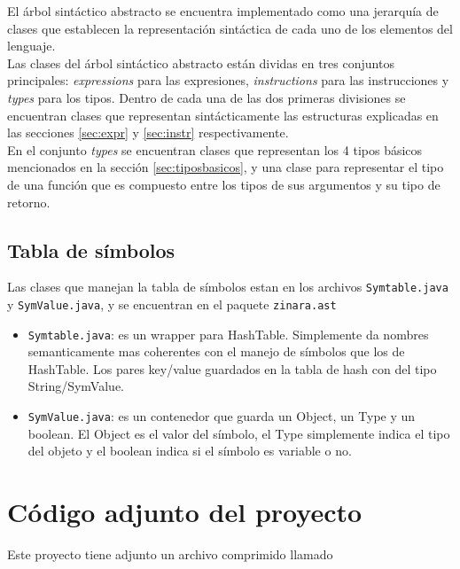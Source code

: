 \documentclass[12pt, spanish]{report}
\begin{document}
El árbol sintáctico abstracto se encuentra implementado como una
jerarquía de clases que establecen la representación sintáctica de
cada uno de los elementos del lenguaje.\\

Las clases del árbol sintáctico abstracto están dividas en tres
conjuntos principales: \emph{expressions} para las expresiones,
\emph{instructions} para las instrucciones y \emph{types} para los
tipos. Dentro de cada una de las dos primeras divisiones se encuentran
clases que representan sintácticamente las estructuras explicadas en
las secciones \ref{sec:expr} y \ref{sec:instr} respectivamente.\\

En el conjunto \emph{types} se encuentran clases que representan los 4
tipos básicos mencionados en la sección \ref{sec:tiposbasicos}, y una
clase para representar el tipo de una función que es compuesto entre
los tipos de sus argumentos y su tipo de retorno.

\subsection{Tabla de s\'imbolos}
\label{sec:st}

Las clases que manejan la tabla de s\'imbolos estan en los archivos
\texttt{Symtable.java} y \texttt{SymValue.java}, y se encuentran en el paquete
\texttt{zinara.ast} 

\begin{itemize}
\item \texttt{Symtable.java}: es un wrapper para HashTable. Simplemente
  da nombres semanticamente mas coherentes con el manejo de s\'imbolos
  que los de HashTable. Los pares key/value guardados en la tabla de
  hash con del tipo String/SymValue.

\item \texttt{SymValue.java}: es un contenedor que guarda un Object,
  un Type y un boolean. El Object es el valor del s\'imbolo, el Type
  simplemente indica el tipo del objeto y el boolean indica si el
  s\'imbolo es variable o no.
\end{itemize}

\section{Código adjunto del proyecto}
\label{sec:correr}

Este proyecto tiene adjunto un archivo comprimido llamado\\
\end{document}
